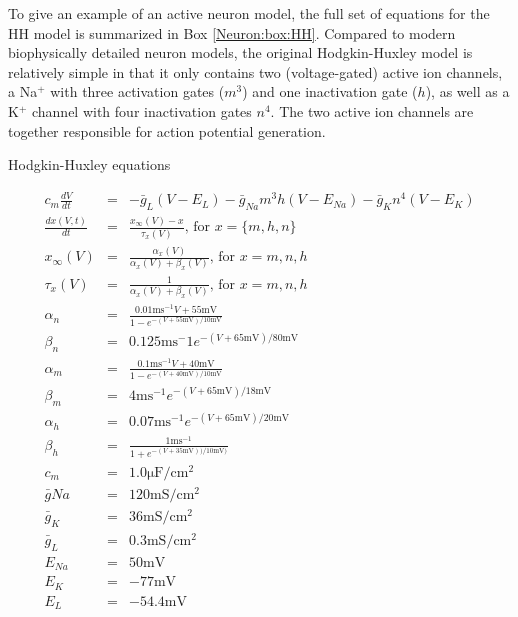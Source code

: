 To give an example of an active neuron model, the full set of equations for the HH model is summarized in Box \ref{Neuron:box:HH}. Compared to modern biophysically detailed neuron models, the original Hodgkin-Huxley model is relatively simple in that it only contains two (voltage-gated) active ion channels, a Na$^+$ with three activation gates ($m^3$) and one inactivation gate ($h$), as well as a K$^+$ channel with four inactivation gates $n^4$. The two active ion channels are together responsible for action potential generation.  

\begin{floatingbox}[h]
\caption{Hodgkin-Huxley equations}

\begin{eqnarray*}
    c_m \frac{dV}{dt} & =  & -\bar{g}_L(V-E_L) - \bar{g}_{Na} m^3 h (V - E_{Na}) - \bar{g}_{K} n^4 (V - E_{K}) \\
    \frac{dx(V,t)}{dt} & = & \frac{x_{\infty}(V) - x}{\tau_x(V)},  \, \text{for } x = \{m,h,n\} \\ 
    x_{\infty}(V) &= & \frac{\alpha_x(V)}{\alpha_x(V) + \beta_x(V)}, \, \text{for } x = m,n,h \\ %
    \tau_x(V) & = & \frac{1}{\alpha_x(V) + \beta_x(V)}, \, \text{for } x = m,n,h \\ %
    \alpha_n &=& \frac{0.01 \mathrm{ms}^{-1} V+55 \mathrm{mV}}{1-e^{-(V+55 \mathrm{mV})/10 \mathrm{mV}}}  \\ %
     \beta_n &=& 0.125 \mathrm{ms}^-1 e^{-(V+65 \mathrm{mV})/80 \mathrm{mV}}   \\ %
     \alpha_m &=& \frac{0.1 \mathrm{ms}^{-1} V+ 40 \mathrm{mV}} {1-e^{-(V+40 \mathrm{mV})/10 \mathrm{mV}}}  \\   
     \beta_m &=& 4 \mathrm{ms}^{-1} e^{-(V+65  \mathrm{mV})/18 \mathrm{mV}}  \\ %
    \alpha_h &=& 0.07 \mathrm{ms}^{-1} e^{-(V+65 \mathrm{mV})/20 \mathrm{mV}}  \\ %
    \beta_h &=& \frac{1 \mathrm{ms}^{-1}}{1+e^{-(V+35 \mathrm{mV}))/10 \mathrm{mV})}}   \\ %
    c_m &=& 1.0 \mathrm{\mu F/cm^2} \\ %
    \bar{g}{Na} &=& 120 \mathrm{mS/cm^2}\\ %
    \bar{g}_{K} &=& 36 \mathrm{mS/cm^2} \\ %
    \bar{g}_{L} &=& 0.3 \mathrm{mS/cm^2} \\ %
    E_{Na} &=& 50 \mathrm{mV} \\ %
    E_{K} &=& -77  \mathrm{mV} \\ %
    E_{L} &=& -54.4 \mathrm{mV} \\ %
\end{eqnarray*}
\label{Neuron:box:HH}
\end{floatingbox}




